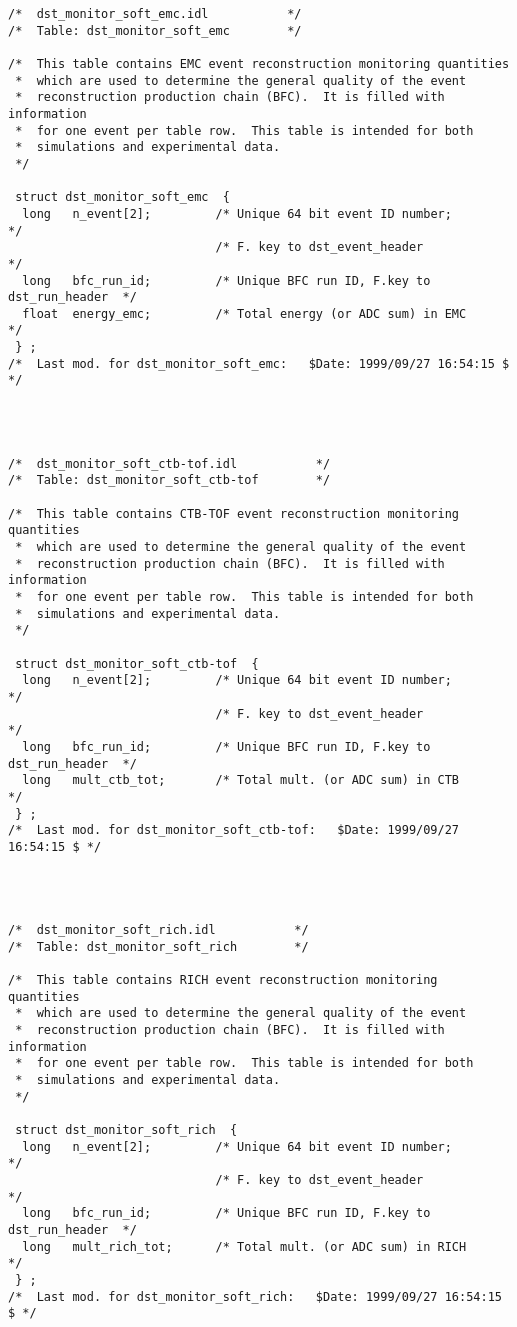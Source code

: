 \begin{verbatim}
/*  dst_monitor_soft_emc.idl           */
/*  Table: dst_monitor_soft_emc        */

/*  This table contains EMC event reconstruction monitoring quantities
 *  which are used to determine the general quality of the event
 *  reconstruction production chain (BFC).  It is filled with information
 *  for one event per table row.  This table is intended for both
 *  simulations and experimental data.
 */

 struct dst_monitor_soft_emc  {
  long   n_event[2];         /* Unique 64 bit event ID number;       */
                             /* F. key to dst_event_header           */
  long   bfc_run_id;         /* Unique BFC run ID, F.key to dst_run_header  */
  float  energy_emc;         /* Total energy (or ADC sum) in EMC     */
 } ;
/*  Last mod. for dst_monitor_soft_emc:   $Date: 1999/09/27 16:54:15 $ */




/*  dst_monitor_soft_ctb-tof.idl           */
/*  Table: dst_monitor_soft_ctb-tof        */

/*  This table contains CTB-TOF event reconstruction monitoring quantities
 *  which are used to determine the general quality of the event
 *  reconstruction production chain (BFC).  It is filled with information
 *  for one event per table row.  This table is intended for both
 *  simulations and experimental data.
 */

 struct dst_monitor_soft_ctb-tof  {
  long   n_event[2];         /* Unique 64 bit event ID number;       */
                             /* F. key to dst_event_header           */
  long   bfc_run_id;         /* Unique BFC run ID, F.key to dst_run_header  */
  long   mult_ctb_tot;       /* Total mult. (or ADC sum) in CTB      */ 
 } ;
/*  Last mod. for dst_monitor_soft_ctb-tof:   $Date: 1999/09/27 16:54:15 $ */




/*  dst_monitor_soft_rich.idl           */
/*  Table: dst_monitor_soft_rich        */

/*  This table contains RICH event reconstruction monitoring quantities
 *  which are used to determine the general quality of the event
 *  reconstruction production chain (BFC).  It is filled with information
 *  for one event per table row.  This table is intended for both
 *  simulations and experimental data.
 */

 struct dst_monitor_soft_rich  {
  long   n_event[2];         /* Unique 64 bit event ID number;       */
                             /* F. key to dst_event_header           */
  long   bfc_run_id;         /* Unique BFC run ID, F.key to dst_run_header  */
  long   mult_rich_tot;      /* Total mult. (or ADC sum) in RICH      */ 
 } ;
/*  Last mod. for dst_monitor_soft_rich:   $Date: 1999/09/27 16:54:15 $ */





\end{verbatim}
